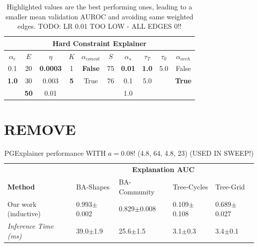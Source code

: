 \begin{table}[h]
    \centering
    \scriptsize
    \begin{tabular}{|c|c|c|c|c|c|c|c|c|c|}
    \hline
    \multicolumn{10}{|c|}{\textbf{Hard Constraint Explainer}} \\ \hline
    $\alpha_e$ & $E$ & $\eta$ & $K$ & $\alpha_{concat}$ & $S$ & $\alpha_s$ & $\tau_T$ & $\tau_0$ & $\alpha_{arch}$ \\ \hline
    0.1 & 20 & \textbf{0.0003} & 1  & \textbf{False} & 75 & \textbf{0.01} & \textbf{1.0} & 5.0 & False \\
    \textbf{1.0} & 30 & 0.003  & \textbf{5}  & True  & 76 & 0.1 & 5.0 &  & \textbf{True}  \\
        &  \textbf{50} & 0.01   &  &       &     &   1.0   &      &      &       \\ \hline
    \end{tabular}
    \caption[NeuroSAT hard constraint Sweep]{Highlighted values are the best performing ones, leading to a smaller mean validation AUROC and avoiding same weighted edges. TODO: LR 0.01 TOO LOW - ALL EDGES 0!!}
\end{table}


\section{REMOVE}
\begin{table}[ht]
  \centering
  \scriptsize
  \begin{tabularx}{\textwidth}{l*{4}{X}}   %
  \toprule
  \textbf{} & \multicolumn{4}{c}{\textbf{Explanation AUC}} \\
  \cmidrule{2-5}
  \textbf{Method} & BA-Shapes & BA-Community & Tree-Cycles & Tree-Grid \\
  \midrule
  Our work (inductive) & 0.993$\pm$0.002 & 0.829$\pm$0.008 & 0.109$\pm$0.108 & 0.689$\pm$0.027 \\
  \addlinespace
  \midrule
  \midrule
  \textit{Inference Time (ms)} & 39.0$\pm$1.9 & 25.6$\pm$1.5 & 3.1$\pm$0.3 & 3.4$\pm$0.1 \\
  \bottomrule
  \end{tabularx}
  \caption[REMOVE! PGExplainer with $a=0.08$!]{PGExplainer performance WITH $a=0.08$! (4.8, 64, 4.8, 23) (USED IN SWEEP!)}
  \label{tab:pgexplainer_auc}
\end{table}